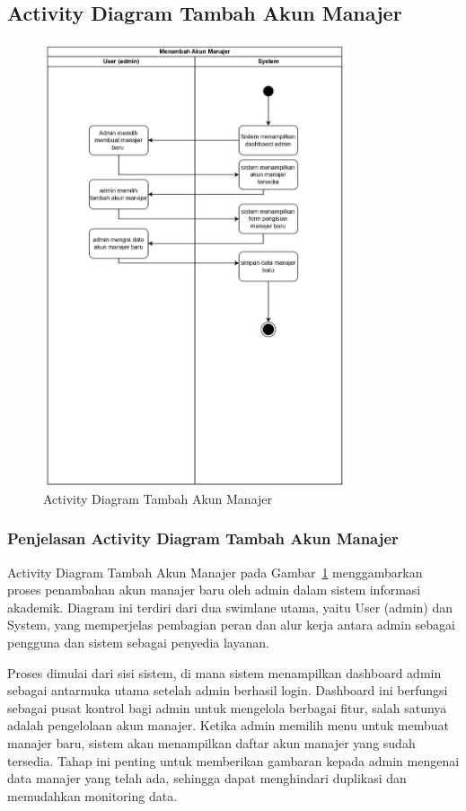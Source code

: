 \documentclass[a4paper,oneside,11pt]{book}
\begin{document}
\subsection{Activity Diagram Tambah Akun Manajer}
\begin{figure}[H]
  \centering
  \includegraphics[width=0.8\textwidth]{Activity Diagram/Tambah akun manajer.jpg}
  \caption{Activity Diagram Tambah Akun Manajer}
  \label{fig:activity_tambah_akun_manajer}
\end{figure}

\subsubsection{Penjelasan Activity Diagram Tambah Akun Manajer}
Activity Diagram Tambah Akun Manajer pada Gambar~\ref{fig:activity_tambah_akun_manajer} menggambarkan proses penambahan akun manajer baru oleh admin dalam sistem informasi akademik. Diagram ini terdiri dari dua swimlane utama, yaitu User (admin) dan System, yang memperjelas pembagian peran dan alur kerja antara admin sebagai pengguna dan sistem sebagai penyedia layanan.

Proses dimulai dari sisi sistem, di mana sistem menampilkan dashboard admin sebagai antarmuka utama setelah admin berhasil login. Dashboard ini berfungsi sebagai pusat kontrol bagi admin untuk mengelola berbagai fitur, salah satunya adalah pengelolaan akun manajer. Ketika admin memilih menu untuk membuat manajer baru, sistem akan menampilkan daftar akun manajer yang sudah tersedia. Tahap ini penting untuk memberikan gambaran kepada admin mengenai data manajer yang telah ada, sehingga dapat menghindari duplikasi dan memudahkan monitoring data.
\end{document}
